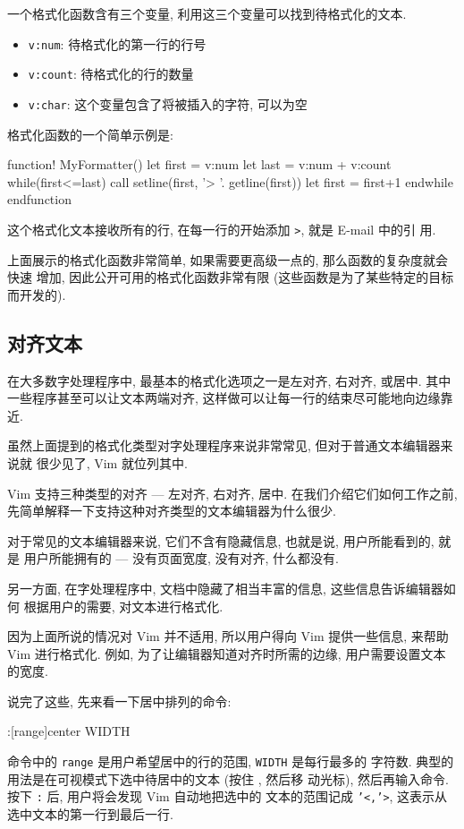 一个格式化函数含有三个变量, 利用这三个变量可以找到待格式化的文本.
\begin{itemize}
    \item \texttt{v:num}: 待格式化的第一行的行号
    \item \texttt{v:count}: 待格式化的行的数量
    \item \texttt{v:char}: 这个变量包含了将被插入的字符, 可以为空
\end{itemize}

格式化函数的一个简单示例是:
\begin{vimcode}
function! MyFormatter()
   let first = v:num
   let last = v:num + v:count
    while(first<=last)
       call setline(first, '> '. getline(first))
       let first = first+1
    endwhile
endfunction
\end{vimcode}
这个格式化文本接收所有的行, 在每一行的开始添加 \texttt{>}, 就是 E-mail 中的引
用.

上面展示的格式化函数非常简单, 如果需要更高级一点的, 那么函数的复杂度就会快速
增加, 因此公开可用的格式化函数非常有限 (这些函数是为了某些特定的目标而开发的).

\subsection{对齐文本}
\label{subsec:aligning_text}

在大多数字处理程序中, 最基本的格式化选项之一是左对齐, 右对齐, 或居中. 其中
一些程序甚至可以让文本两端对齐, 这样做可以让每一行的结束尽可能地向边缘靠近.

虽然上面提到的格式化类型对字处理程序来说非常常见, 但对于普通文本编辑器来说就
很少见了, Vim 就位列其中.

Vim 支持三种类型的对齐 --- 左对齐, 右对齐, 居中. 在我们介绍它们如何工作之前,
先简单解释一下支持这种对齐类型的文本编辑器为什么很少.

对于常见的文本编辑器来说, 它们不含有隐藏信息, 也就是说, 用户所能看到的, 就是
用户所能拥有的 --- 没有页面宽度, 没有对齐, 什么都没有.

另一方面, 在字处理程序中, 文档中隐藏了相当丰富的信息, 这些信息告诉编辑器如何
根据用户的需要, 对文本进行格式化.

因为上面所说的情况对 Vim 并不适用, 所以用户得向 Vim 提供一些信息, 来帮助 Vim
进行格式化. 例如, 为了让编辑器知道对齐时所需的边缘, 用户需要设置文本的宽度.

说完了这些, 先来看一下居中排列的命令:
\begin{vimcode}
:[range]center WIDTH
\end{vimcode}
命令中的 \texttt{range} 是用户希望居中的行的范围, \texttt{WIDTH} 是每行最多的
字符数. 典型的用法是在可视模式下选中待居中的文本 (按住 , 然后移
动光标), 然后再输入命令. 按下 \texttt{:} 后, 用户将会发现 Vim 自动地把选中的
文本的范围记成 \texttt{'<,'>}, 这表示从选中文本的第一行到最后一行.

